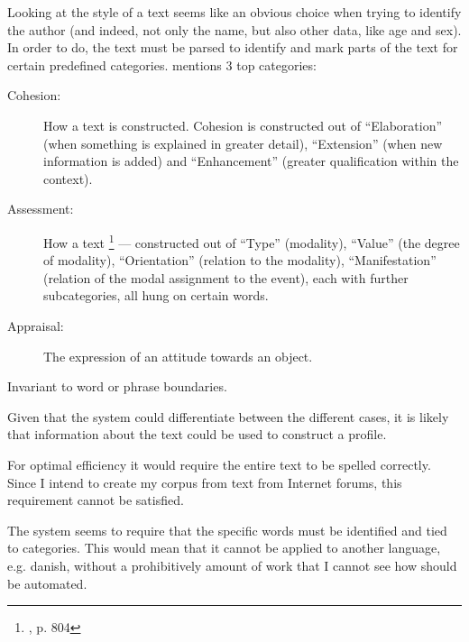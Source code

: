 {\label{stylistic}
Looking at the style of a text seems like an obvious choice when trying to identify the author (and indeed, not only the name, but also other data, like age and sex). In order to do, the text must be parsed to identify and mark parts of the text for certain predefined categories. \cite{style} mentions 3 top categories: 
\begin{description}
\item[Cohesion:] How a text is constructed. Cohesion is constructed out of  ``Elaboration'' (when something is explained in greater detail), ``Extension'' (when new information is added) and ``Enhancement'' (greater qualification within the context).
\item[Assessment:] How a text \footnote{\cite{style}, p. 804} --- constructed out of  ``Type'' (modality), ``Value'' (the degree of modality), ``Orientation'' (relation to the modality), ``Manifestation'' (relation of the modal assignment to the event), each with further subcategories, all hung on certain words.
\item[Appraisal:] The expression of an attitude towards an object.
\end{description}
}
{
}  
{
\item Invariant to word or phrase boundaries.
\item Given that the system could differentiate between the different cases, it is likely that information about the text could be used to construct a profile.
}{
\item For optimal efficiency it would require the entire text to be spelled correctly. Since I intend to create my corpus from text from Internet forums, this requirement cannot be satisfied.
\item The system seems to require that the specific words must be identified and tied to categories. This would mean that it cannot be applied to another language, e.g. danish,  without a prohibitively amount of work that I cannot see how should be automated.
} 

